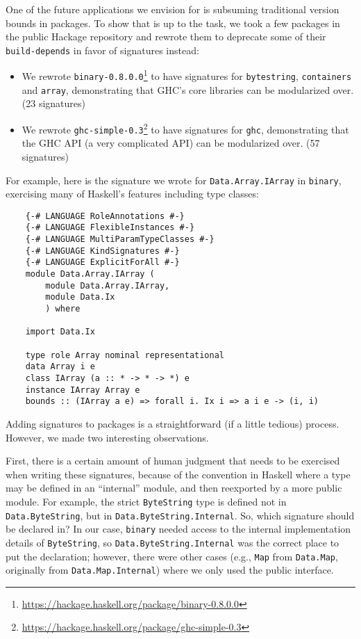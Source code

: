 One of the future applications we envision for \Backpack{} is subsuming
traditional version bounds in packages.  To show that \Backpack{} is up
to the task, we took a few packages in the public Hackage repository and
rewrote them to deprecate some of their \verb|build-depends| in favor of
signatures instead:

\begin{itemize}
    \item We rewrote \texttt{binary-0.8.0.0}\footnote{\smaller\url{https://hackage.haskell.org/package/binary-0.8.0.0}}
          to have signatures
          for \texttt{byte\-string}, \texttt{containers} and \texttt{array},
          demonstrating that GHC's core libraries can be modularized
          over. (23 signatures)

    \item We rewrote \texttt{ghc-simple-0.3}\footnote{\smaller\url{https://hackage.haskell.org/package/ghc-simple-0.3}} to have signatures
          for \texttt{ghc}, demonstrating that the GHC API (a very
          complicated API) can be modularized over. (57 signatures)
\end{itemize}
%
For example, here is the signature we wrote for
\texttt{Data.\allowbreak{}Array.\allowbreak{}IArray} in \texttt{binary},
exercising many of Haskell's features including type classes:

\begin{verbatim}
    {-# LANGUAGE RoleAnnotations #-}
    {-# LANGUAGE FlexibleInstances #-}
    {-# LANGUAGE MultiParamTypeClasses #-}
    {-# LANGUAGE KindSignatures #-}
    {-# LANGUAGE ExplicitForAll #-}
    module Data.Array.IArray (
        module Data.Array.IArray,
        module Data.Ix
        ) where

    import Data.Ix

    type role Array nominal representational
    data Array i e
    class IArray (a :: * -> * -> *) e
    instance IArray Array e
    bounds :: (IArray a e) => forall i. Ix i => a i e -> (i, i)
\end{verbatim}
%
Adding signatures to packages is a straightforward (if a little tedious)
process.  However, we made two interesting observations.

First, there is a certain amount of human judgment that needs to be
exercised when writing these signatures, because of the convention in
Haskell where a type may be defined in an ``internal'' module, and then
reexported by a more public module.  For example, the strict
\verb|ByteString| type is defined not in \verb|Data.ByteString|,
but in \verb|Data.ByteString.Internal|.  So, which signature should
be declared in?  In our case, \verb|binary| needed access to the
internal implementation details of \verb|ByteString|, so \verb|Data.ByteString.Internal|
was the correct place to put the declaration; however, there
were other cases (e.g., \verb|Map| from \verb|Data.Map|, originally
from \verb|Data.Map.Internal|) where we only used the public interface.

